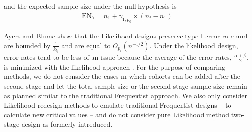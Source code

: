 \documentclass[12pt]{report}\usepackage[]{graphicx}\usepackage[]{color}
\newlength{\li}\setlength{\li}{14.48pt}
\newlength{\di}\setlength{\di}{-3.5mm}
\begin{document}
and the expected sample size under the null hypothesis is 
\begin{equation}
\begin{aligned}
\mbox{EN}_0 = n_1 + \gamma_{1,p_0} \times (n_t - n_1)
\end{aligned}
\end{equation}

 
\indent Ayers and Blume \cite{Ayers} show that the Likelihood designs preserve type I error rate and are bounded by $\frac{1}{k_{b_t}}$ and are equal to $O_{p_i}\left({n}^{-1/2}\right)$. Under the likelihood design, error rates tend to be less of an issue because the average of the error rates, $\frac{\alpha + \beta}{2}$, is minimized with the likelihood approach \cite{Ayers}. For the purpose of comparing methods, we do not consider the cases in which cohorts can be added after the second stage and let the total sample size or the second stage sample size remain as planned similar to the traditional Frequentist approach. We also only consider Likelihood redesign methods to emulate traditional Frequentist designs -- to calculate new critical values -- and do not consider pure Likelihood method two-stage design as formerly introduced. 
\end{document}

